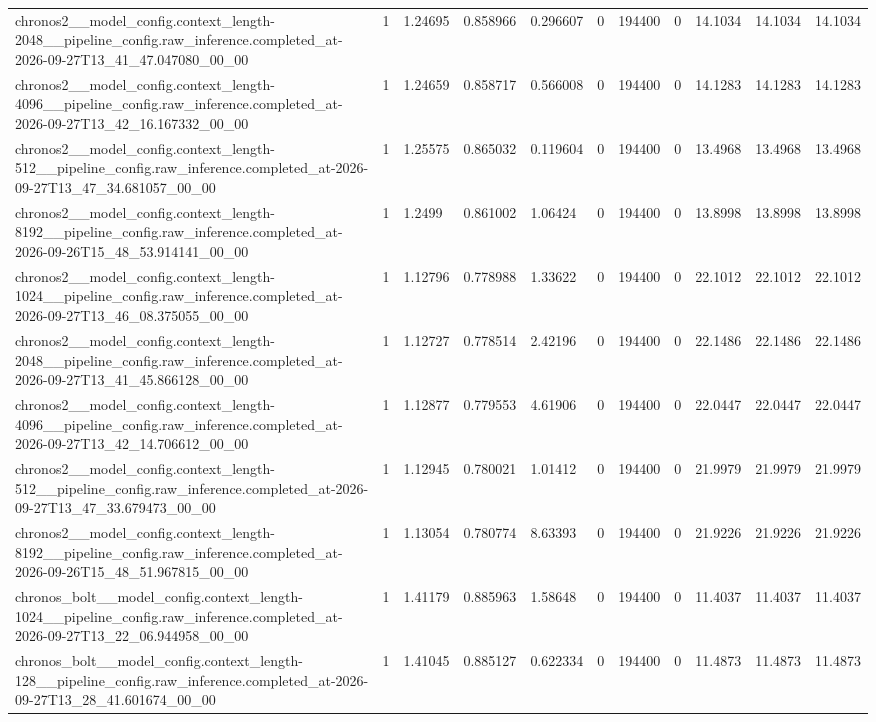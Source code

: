 \begin{tabular}{lllllllllll}
chronos2\_\_model\_config.context\_length-2048\_\_pipeline\_config.raw\_inference.completed\_at-2026-09-27T13\_41\_47.047080\_00\_00 & 1 & 1.24695 & 0.858966 & 0.296607 & 0 & 194400 & 0 & 14.1034 & 14.1034 & 14.1034 \\
chronos2\_\_model\_config.context\_length-4096\_\_pipeline\_config.raw\_inference.completed\_at-2026-09-27T13\_42\_16.167332\_00\_00 & 1 & 1.24659 & 0.858717 & 0.566008 & 0 & 194400 & 0 & 14.1283 & 14.1283 & 14.1283 \\
chronos2\_\_model\_config.context\_length-512\_\_pipeline\_config.raw\_inference.completed\_at-2026-09-27T13\_47\_34.681057\_00\_00 & 1 & 1.25575 & 0.865032 & 0.119604 & 0 & 194400 & 0 & 13.4968 & 13.4968 & 13.4968 \\
chronos2\_\_model\_config.context\_length-8192\_\_pipeline\_config.raw\_inference.completed\_at-2026-09-26T15\_48\_53.914141\_00\_00 & 1 & 1.2499 & 0.861002 & 1.06424 & 0 & 194400 & 0 & 13.8998 & 13.8998 & 13.8998 \\
chronos2\_\_model\_config.context\_length-1024\_\_pipeline\_config.raw\_inference.completed\_at-2026-09-27T13\_46\_08.375055\_00\_00 & 1 & 1.12796 & 0.778988 & 1.33622 & 0 & 194400 & 0 & 22.1012 & 22.1012 & 22.1012 \\
chronos2\_\_model\_config.context\_length-2048\_\_pipeline\_config.raw\_inference.completed\_at-2026-09-27T13\_41\_45.866128\_00\_00 & 1 & 1.12727 & 0.778514 & 2.42196 & 0 & 194400 & 0 & 22.1486 & 22.1486 & 22.1486 \\
chronos2\_\_model\_config.context\_length-4096\_\_pipeline\_config.raw\_inference.completed\_at-2026-09-27T13\_42\_14.706612\_00\_00 & 1 & 1.12877 & 0.779553 & 4.61906 & 0 & 194400 & 0 & 22.0447 & 22.0447 & 22.0447 \\
chronos2\_\_model\_config.context\_length-512\_\_pipeline\_config.raw\_inference.completed\_at-2026-09-27T13\_47\_33.679473\_00\_00 & 1 & 1.12945 & 0.780021 & 1.01412 & 0 & 194400 & 0 & 21.9979 & 21.9979 & 21.9979 \\
chronos2\_\_model\_config.context\_length-8192\_\_pipeline\_config.raw\_inference.completed\_at-2026-09-26T15\_48\_51.967815\_00\_00 & 1 & 1.13054 & 0.780774 & 8.63393 & 0 & 194400 & 0 & 21.9226 & 21.9226 & 21.9226 \\
chronos\_bolt\_\_model\_config.context\_length-1024\_\_pipeline\_config.raw\_inference.completed\_at-2026-09-27T13\_22\_06.944958\_00\_00 & 1 & 1.41179 & 0.885963 & 1.58648 & 0 & 194400 & 0 & 11.4037 & 11.4037 & 11.4037 \\
chronos\_bolt\_\_model\_config.context\_length-128\_\_pipeline\_config.raw\_inference.completed\_at-2026-09-27T13\_28\_41.601674\_00\_00 & 1 & 1.41045 & 0.885127 & 0.622334 & 0 & 194400 & 0 & 11.4873 & 11.4873 & 11.4873 \\

\end{tabular}
